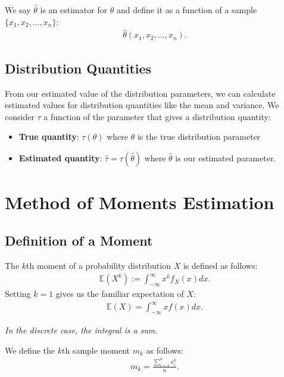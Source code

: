 \documentclass[a4paper, 12pt, twoside]{article}
\begin{document}
We say $\hat{\theta}$ is an estimator for $\theta$ and define it as
a function of a sample $\{x_1, x_2, \ldots, x_n\}$:
\begin{align*}
    \hat{\theta}(x_1, x_2, \ldots, x_n).
\end{align*}

\subsection{Distribution Quantities}

From our estimated value of the distribution parameters, we can
calculate estimated values for distribution quantities like the
mean and variance. We consider $\tau$ a function of the parameter
that gives a distribution quantity:

\begin{itemize}
    \item \textbf{True quantity}: $\tau(\theta)$ where $\theta$
          is the true distribution parameter
    \item \textbf{Estimated quantity}:
          $\hat{\tau} = \tau(\hat{\theta})$ where $\hat{\theta}$ is our
          estimated parameter.
\end{itemize}

\section{Method of Moments Estimation}

\subsection{Definition of a Moment}

The $k$th moment of a probability distribution $X$ is defined as
follows:
\begin{align*}
    \mathbb{E}(X^k) := \int_{-\infty}^{\infty} x^k f_X(x) dx.
\end{align*}
Setting $k = 1$ gives us the familiar expectation of $X$:
\begin{align*}
    \mathbb{E}(X) = \int_{-\infty}^{\infty} x f(x) dx.
\end{align*}

\textit{In the discrete case, the integral is a sum.}

\vspace{\baselineskip}

We define the $k$th sample moment $m_k$ as follows:
\begin{align*}
    m_k = \frac{\sum_{i = 1}^{n} x_i^k}{n}.
\end{align*}
\end{document}
